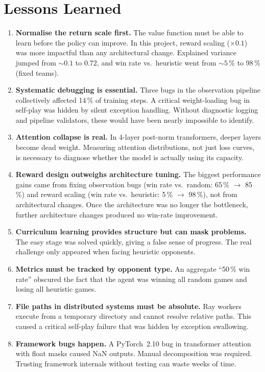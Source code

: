 \section{Lessons Learned}

\begin{enumerate}
  \item \textbf{Normalise the return scale first.}  The value function must
        be able to learn before the policy can improve.  In this project,
        reward scaling ($\times 0.1$) was more impactful than any architectural
        change.  Explained variance jumped from ${\sim}0.1$ to 0.72, and win
        rate vs.\ heuristic went from ${\sim}5$\,\% to 98\,\% (fixed teams).

  \item \textbf{Systematic debugging is essential.}  Three bugs in the
        observation pipeline collectively affected 14\,\% of training steps.
        A critical weight-loading bug in self-play was hidden by silent
        exception handling.  Without diagnostic logging and pipeline
        validators, these would have been nearly impossible to identify.

  \item \textbf{Attention collapse is real.}  In 4-layer post-norm
        transformers, deeper layers become dead weight.  Measuring attention
        distributions, not just loss curves, is necessary to diagnose whether
        the model is actually using its capacity.

  \item \textbf{Reward design outweighs architecture tuning.}  The biggest
        performance gains came from fixing observation bugs (win rate vs.\
        random: 65\,\% $\to$ 85\,\%) and reward scaling (win rate vs.\
        heuristic: 5\,\% $\to$ 98\,\%), not from architectural changes.  Once
        the architecture was no longer the bottleneck, further architecture
        changes produced no win-rate improvement.

  \item \textbf{Curriculum learning provides structure but can mask problems.}
        The easy stage was solved quickly, giving a false sense of progress.
        The real challenge only appeared when facing heuristic opponents.

  \item \textbf{Metrics must be tracked by opponent type.}  An aggregate
        ``50\,\% win rate'' obscured the fact that the agent was winning all
        random games and losing all heuristic games.

  \item \textbf{File paths in distributed systems must be absolute.}  Ray
        workers execute from a temporary directory and cannot resolve relative
        paths.  This caused a critical self-play failure that was hidden by
        exception swallowing.

  \item \textbf{Framework bugs happen.}  A PyTorch~2.10 bug in transformer
        attention with float masks caused NaN outputs.  Manual decomposition
        was required.  Trusting framework internals without testing can waste
        weeks of time.
\end{enumerate}

